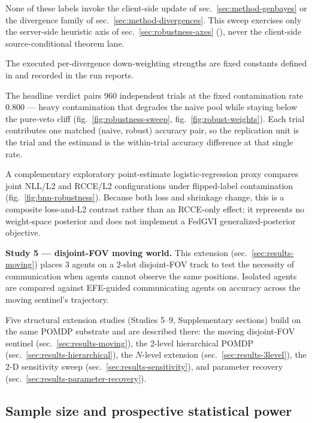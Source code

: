 \documentclass[
  english,
]{article}
\theoremstyle{plain}
\theoremstyle{definition}
\theoremstyle{remark}
\theoremstyle{definition}
\begin{document}
None of these labels invoke the client-side
 update of sec.~\ref{sec:method-genbayes}
or the divergence family of sec.~\ref{sec:method-divergences}. This
sweep exercises only the server-side heuristic axis of
sec.~\ref{sec:robustness-axes} (), never the
client-side source-conditional theorem lane.

The executed per-divergence down-weighting strengths are fixed constants
defined in  and recorded in the
run reports.

The headline verdict pairs 960 independent trials at the fixed
contamination rate 0.800 --- heavy contamination that degrades the naive
pool while staying below the pure-veto cliff
(fig.~\ref{fig:robustness-sweep}, fig.~\ref{fig:robust-weights}). Each
trial contributes one matched (naive, robust) accuracy pair, so the
replication unit is the trial and the estimand is the within-trial
accuracy difference at that single rate.

A complementary exploratory point-estimate logistic-regression proxy
compares joint NLL/L2 and RCCE/L2 configurations under flipped-label
contamination (fig.~\ref{fig:bnn-robustness}). Because both loss and
shrinkage change, this is a composite loss-and-L2 contrast rather than
an RCCE-only effect; it represents no weight-space posterior and does
not implement a FedGVI generalized-posterior objective.

\textbf{Study 5 --- disjoint-FOV moving world.} This extension
(sec.~\ref{sec:results-moving}) places 3 agents on a 2-slot disjoint-FOV
track to test the necessity of communication when agents cannot observe
the same positions. Isolated agents are compared against EFE-guided
communicating agents on accuracy across the moving sentinel's
trajectory.

Five structural extension studies (Studies 5--9, Supplementary sections)
build on the same POMDP substrate and are described there: the moving
disjoint-FOV sentinel (sec.~\ref{sec:results-moving}), the 2-level
hierarchical POMDP (sec.~\ref{sec:results-hierarchical}), the
\(N\)-level extension (sec.~\ref{sec:results-3level}), the 2-D
sensitivity sweep (sec.~\ref{sec:results-sensitivity}), and parameter
recovery (sec.~\ref{sec:results-parameter-recovery}).

\subsection{Sample size and prospective statistical
power}\label{sec:methods-power}
\end{document}
